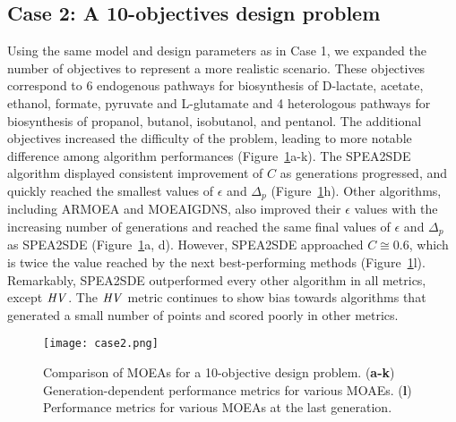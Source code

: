 {\subsection{Case 2: A 10-objectives design problem}
Using the same model and design parameters as in Case 1, we expanded the number of objectives to represent a more realistic scenario.
These objectives correspond to 6 endogenous pathways for biosynthesis of D-lactate, acetate, ethanol, formate, pyruvate and L-glutamate and 4 heterologous pathways for biosynthesis of propanol, butanol, isobutanol, and pentanol.
The additional objectives increased the difficulty of the problem, leading to more notable difference among algorithm performances (Figure~\ref{fig4:case2}a-k).
The SPEA2SDE algorithm displayed consistent improvement of $C$ as generations progressed, and quickly reached the smallest values of  $\epsilon$ and $\Delta_p$ (Figure~\ref{fig4:case2}h).
Other algorithms, including ARMOEA and MOEAIGDNS, also improved their $\epsilon$ values with the increasing number of generations and reached the same final values of $\epsilon$ and $\Delta_p$ as SPEA2SDE (Figure~\ref{fig4:case2}a, d). However, SPEA2SDE approached $C\cong0.6$, which is twice the value reached by the next best-performing methods (Figure~\ref{fig4:case2}l). Remarkably, SPEA2SDE outperformed every other algorithm in all metrics, except $\mathit{HV}$. The $\mathit{HV}$ metric continues to show bias towards algorithms that generated a small number of points and scored poorly in other metrics.


\begin{figure}[p]
    \centering
    \texttt{[image: case2.png]}
    \caption[Comparison of MOEAs for a 10-objective design problem]{Comparison of MOEAs for a 10-objective design problem. (\textbf{a-k}) Generation-dependent performance metrics for various MOAEs. (\textbf{l}) Performance metrics for various MOEAs at the last generation.}
\label{fig4:case2}
\end{figure}


}
